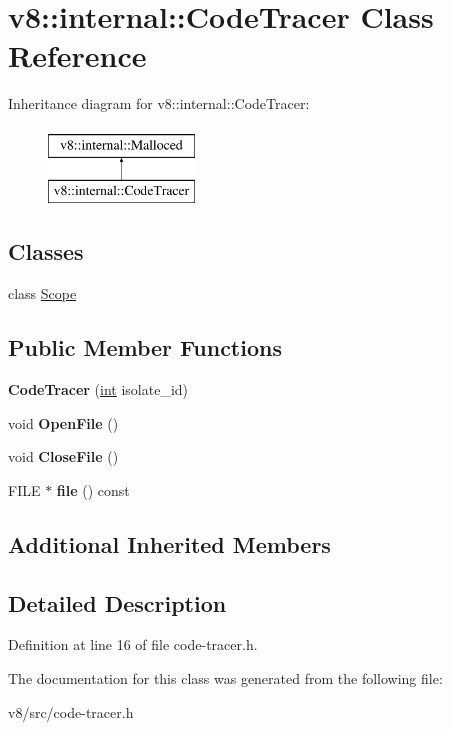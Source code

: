 \hypertarget{classv8_1_1internal_1_1CodeTracer}{}\section{v8\+:\+:internal\+:\+:Code\+Tracer Class Reference}
\label{classv8_1_1internal_1_1CodeTracer}
Inheritance diagram for v8\+:\+:internal\+:\+:Code\+Tracer\+:\begin{figure}[H]
\begin{center}
\leavevmode
\includegraphics[height=2.000000cm]{classv8_1_1internal_1_1CodeTracer}
\end{center}
\end{figure}
\subsection*{Classes}
\begin{DoxyCompactItemize}
\item 
class \mbox{\hyperlink{classv8_1_1internal_1_1CodeTracer_1_1Scope}{Scope}}
\end{DoxyCompactItemize}
\subsection*{Public Member Functions}
\begin{DoxyCompactItemize}
\item 
\mbox{\label{classv8_1_1internal_1_1CodeTracer_a01c6fd042c2f2bec8d012c7c4137e2d1}} 
{\bfseries Code\+Tracer} (\mbox{\hyperlink{classint}{int}} isolate\+\_\+id)
\item 
\mbox{\label{classv8_1_1internal_1_1CodeTracer_a844b34f3cc4aff36a60c699bf1df2945}} 
void {\bfseries Open\+File} ()
\item 
\mbox{\label{classv8_1_1internal_1_1CodeTracer_ae34b0a83ca366d5939413b1ee34529b8}} 
void {\bfseries Close\+File} ()
\item 
\mbox{\label{classv8_1_1internal_1_1CodeTracer_a7d90e18b0414fb71bee4d91342fc1506}} 
F\+I\+LE $\ast$ {\bfseries file} () const
\end{DoxyCompactItemize}
\subsection*{Additional Inherited Members}


\subsection{Detailed Description}


Definition at line 16 of file code-\/tracer.\+h.



The documentation for this class was generated from the following file\+:\begin{DoxyCompactItemize}
\item 
v8/src/code-\/tracer.\+h\end{DoxyCompactItemize}
